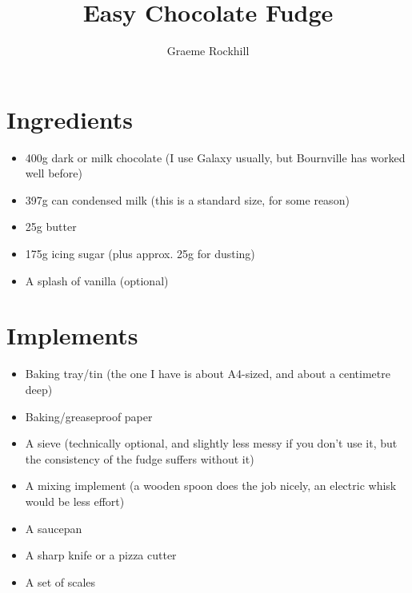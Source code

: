 \documentclass[10pt,a4paper,oneside]{article}
\author{Graeme Rockhill}
\title{Easy Chocolate Fudge}
\begin{document}
\maketitle
\section{Ingredients}
\begin{itemize}

\item 400g dark or milk chocolate (I use Galaxy usually, but Bournville has worked well before)
\item 397g can condensed milk (this is a standard size, for some reason)
\item 25g butter
\item 175g icing sugar (plus approx. 25g for dusting)
\item A splash of vanilla (optional)

\end{itemize}
\section{Implements}
\begin{itemize}

\item Baking tray/tin (the one I have is about A4-sized, and about a centimetre deep)
\item Baking/greaseproof paper
\item A sieve (technically optional, and slightly less messy if you don't use it, but the consistency of the fudge suffers without it)
\item A mixing implement (a wooden spoon does the job nicely, an electric whisk would be less effort)
\item A saucepan
\item A sharp knife or a pizza cutter
\item A set of scales

\end{itemize}
\end{document}
